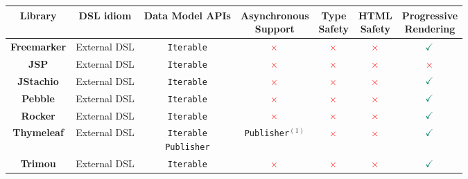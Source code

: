 \begin{table}[h]
  \small
	\tabcolsep=0.1cm
	\def\arraystretch{1.2}
	\begin{tabular}{|c|c|c|c|c|c|c|}
		\hline
		\textbf{Library}
		&\textbf{DSL idiom}
		&\textbf{Data Model APIs}
    &\shortstack{\textbf{Asynchronous}\\\textbf{Support}}
    &\shortstack{\textbf{Type}\\\textbf{Safety}}
    &\shortstack{\textbf{HTML}\\\textbf{Safety}}
		&\shortstack{\textbf{Progressive}\\\textbf{Rendering}}
		\\
		\hline
		\textbf{Freemarker}
		&External DSL
		&\texttt{Iterable}
		&\large{$\textcolor{red}{\times}$}
    &\large{$\textcolor{red}{\times}$}
    &\large{$\textcolor{red}{\times}$}
		&\large{$\textcolor{PineGreen}{\checkmark}$}
		\\
    \hline
		\textbf{JSP}
		&External DSL
		&\texttt{Iterable}
		&\large{$\textcolor{red}{\times}$}
    &\large{$\textcolor{red}{\times}$}
    &\large{$\textcolor{red}{\times}$}
		&\large{$\textcolor{red}{\times}$}
    \\
    \hline
		\textbf{JStachio}
		&External DSL
		&\texttt{Iterable}
		&\large{$\textcolor{red}{\times}$}
    &\large{$\textcolor{red}{\times}$}
    &\large{$\textcolor{red}{\times}$}
		&\large{$\textcolor{PineGreen}{\checkmark}$}
		\\\hline
		\textbf{Pebble}
		&External DSL
		&\texttt{Iterable}
		&\large{$\textcolor{red}{\times}$}
    &\large{$\textcolor{red}{\times}$}
    &\large{$\textcolor{red}{\times}$}
		&\large{$\textcolor{PineGreen}{\checkmark}$}
		\\
    \hline
		\textbf{Rocker}
		&External DSL
		&\texttt{Iterable}
		&\large{$\textcolor{red}{\times}$}
    &\large{$\textcolor{red}{\times}$}
    &\large{$\textcolor{red}{\times}$}
		&\large{$\textcolor{PineGreen}{\checkmark}$}
		\\
    \hline
		\textbf{Thymeleaf}
		&External DSL
		&\shortstack{\texttt{Iterable}\\\texttt{Publisher}}
		&\texttt{Publisher}$^{(1)}$
    &\large{$\textcolor{red}{\times}$}
    &\large{$\textcolor{red}{\times}$}
		&\large{$\textcolor{PineGreen}{\checkmark}$}
		\\
    \hline
		\textbf{Trimou}
		&External DSL
		&\texttt{Iterable}
		&\large{$\textcolor{red}{\times}$}
    &\large{$\textcolor{red}{\times}$}
    &\large{$\textcolor{red}{\times}$}
		&\large{$\textcolor{PineGreen}{\checkmark}$}

\end{tabular}
\end{table}
